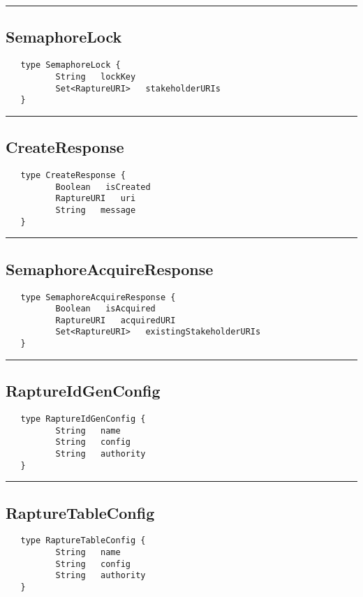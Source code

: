\rule{15cm}{2pt}
\subsection{SemaphoreLock}
\label{type:SemaphoreLock}

\begin{verbatim}
   type SemaphoreLock {
          String   lockKey
          Set<RaptureURI>   stakeholderURIs
   }
\end{verbatim}

\rule{15cm}{2pt}
\subsection{CreateResponse}
\label{type:CreateResponse}

\begin{verbatim}
   type CreateResponse {
          Boolean   isCreated
          RaptureURI   uri
          String   message
   }
\end{verbatim}

\rule{15cm}{2pt}
\subsection{SemaphoreAcquireResponse}
\label{type:SemaphoreAcquireResponse}

\begin{verbatim}
   type SemaphoreAcquireResponse {
          Boolean   isAcquired
          RaptureURI   acquiredURI
          Set<RaptureURI>   existingStakeholderURIs
   }
\end{verbatim}

\rule{15cm}{2pt}
\subsection{RaptureIdGenConfig}
\label{type:RaptureIdGenConfig}

\begin{verbatim}
   type RaptureIdGenConfig {
          String   name
          String   config
          String   authority
   }
\end{verbatim}

\rule{15cm}{2pt}
\subsection{RaptureTableConfig}
\label{type:RaptureTableConfig}

\begin{verbatim}
   type RaptureTableConfig {
          String   name
          String   config
          String   authority
   }
\end{verbatim}

